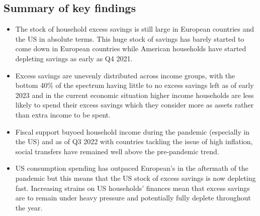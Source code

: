 \subsection{Summary of key findings}
\begin{itemize}
    \item The stock of household excess savings is still large in European countries and the US in absolute terms. This huge stock of savings has barely started to come down in European countries while American households have started depleting savings as early as Q4 2021. 
    \item Excess savings are unevenly distributed across income groups, with the bottom 40\% of the spectrum having little to no excess savings left as of early 2023 and in the current economic situation higher income households are less likely to spend their excess savings which they consider more as assets rather than extra income to be spent.
    \item Fiscal support buyoed household income during the pandemic (especially in the US) and as of Q3 2022 with countries tackling the issue of high inflation, social transfers have remained well above the pre-pandemic trend.
    \item US consumption spending has outpaced European’s in the aftermath of the pandemic but this means that the US stock of excess savings is now depleting fast. Increasing strains on US households’ finances mean that excess savings are to remain under heavy pressure and potentially fully deplete throughout the year.
\end{itemize}